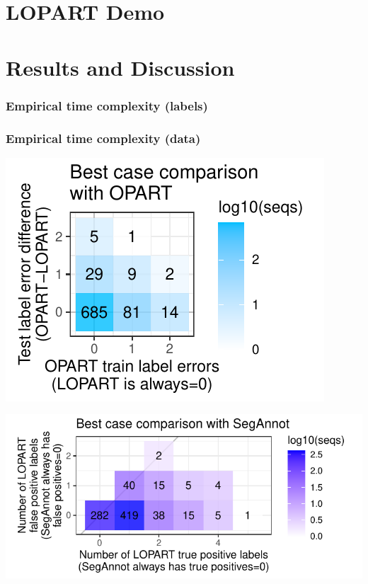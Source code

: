 \documentclass{beamer}
\begin{document}
\section{LOPART Demo}

\newcommand\Wider[2][3cm]{%
\makebox[\linewidth][c]{%
  \begin{minipage}{\dimexpr\textwidth+#1\relax}
  \raggedright#2
  \end{minipage}%
  }%
}



\section{Results and Discussion}

\begin{frame}
  \frametitle{Empirical time complexity (labels)}
  
\end{frame}

\begin{frame}
  \frametitle{Empirical time complexity (data)}
  
\end{frame}

\begin{frame}
  \includegraphics[width=\textwidth]{figure-label-errors}
\end{frame}

\begin{frame}
  \includegraphics[width=\textwidth]{figure-label-errors-SegAnnot}
\end{frame}
\end{document}
